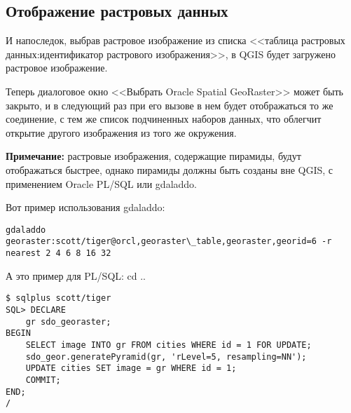 \subsection{Отображение растровых данных}

И напоследок, выбрав растровое изображение из списка <<таблица растровых
данных:идентификатор растрового изображения>>, в QGIS будет загружено
растровое изображение.

Теперь диалоговое окно <<Выбрать Oracle Spatial GeoRaster>> может быть
закрыто, и в следующий раз при его вызове в нем будет отображаться то же
соединение, с тем же список подчиненных наборов данных, что облегчит
открытие другого изображения из того же окружения.

\textbf{Примечание:} растровые изображения, содержащие пирамиды, будут
отображаться быстрее, однако пирамиды должны быть созданы вне QGIS, с
применением Oracle PL/SQL или gdaladdo.

Вот пример использования gdaladdo:

\begin{verbatim}
gdaladdo georaster:scott/tiger@orcl,georaster\_table,georaster,georid=6 -r
nearest 2 4 6 8 16 32
\end{verbatim}

А это пример для PL/SQL:
cd ..
\begin{verbatim}
$ sqlplus scott/tiger
SQL> DECLARE
    gr sdo_georaster;
BEGIN
    SELECT image INTO gr FROM cities WHERE id = 1 FOR UPDATE;
    sdo_geor.generatePyramid(gr, 'rLevel=5, resampling=NN');
    UPDATE cities SET image = gr WHERE id = 1;
    COMMIT;
END;
/
\end{verbatim}

\FloatBarrier
